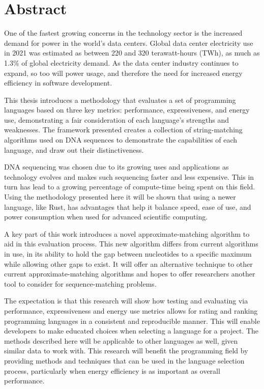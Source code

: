 \section*{Abstract}

One of the fastest growing concerns in the technology sector is the increased demand for power in the world's data centers. Global data center electricity use in 2021 was estimated as between 220 and 320 terawatt-hours (TWh), as much as 1.3\% of global electricity demand. As the data center industry continues to expand, so too will power usage, and therefore the need for increased energy efficiency in software development.

This thesis introduces a methodology that evaluates a set of programming languages based on three key metrics: performance, expressiveness, and energy use, demonstrating a fair consideration of each language's strengths and weaknesses. The framework presented creates a collection of string-matching algorithms used on DNA sequences to demonstrate the capabilities of each language, and draw out their distinctiveness.

DNA sequencing was chosen due to its growing uses and applications as technology evolves and makes such sequencing faster and less expensive. This in turn has lead to a growing percentage of compute-time being spent on this field. Using the methodology presented here it will be shown that using a newer language, like Rust, has advantages that help it balance speed, ease of use, and power consumption when used for advanced scientific computing.

A key part of this work introduces a novel approximate-matching algorithm to aid in this evaluation process. This new algorithm differs from current algorithms in use, in its ability to hold the gap between nucleotides to a specific maximum while allowing other gaps to exist. It will offer an alternative technique to other current approximate-matching algorithms and hopes to offer researchers another tool to consider for sequence-matching problems.

The expectation is that this research will show how testing and evaluating via performance, expressiveness and energy use metrics allows for rating and ranking programming languages in a consistent and reproducible manner. This will enable developers to make educated choices when selecting a language for a project. The methods described here will be applicable to other languages as well, given similar data to work with. This research will benefit the programming field by providing methods and techniques that can be used in the language selection process, particularly when energy efficiency is as important as overall performance.
